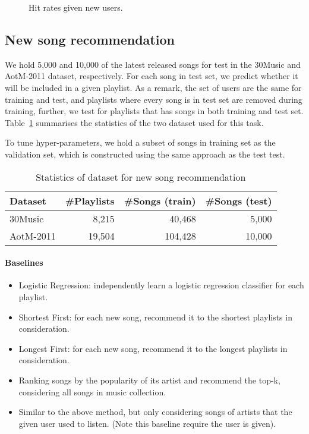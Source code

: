 

\begin{figure}[!h]
\centering
\caption{Hit rates given new users.}
\end{figure}



\subsection{New song recommendation}
\label{ssec:newsongrec}

We hold 5,000 and 10,000 of the latest released songs for test in the 30Music and AotM-2011 dataset, respectively.
For each song in test set, we predict whether it will be included in a given playlist.
As a remark, the set of users are the same for training and test, 
and playlists where every song is in test set are removed during training,
further, we test for playlists that has songs in both training and test set.
Table~\ref{tab:stats_newsongrec} summarises the statistics of the two dataset used for this task.

To tune hyper-parameters, we hold a subset of songs in training set as the validation set, 
which is constructed using the same approach as the test test.

\begin{table}[!h]
\centering
\caption{Statistics of dataset for new song recommendation}
\label{tab:stats_newsongrec}
\small
\begin{tabular}{lrrr}
\toprule
Dataset   & \#Playlists & \#Songs (train) & \#Songs (test) \\
\midrule
30Music   & 8,215       & 40,468          & 5,000 \\
AotM-2011 & 19,504      & 104,428         & 10,000 \\
\bottomrule
\end{tabular}
\end{table}

\paragraph{Baselines}
\begin{itemize}
\item Logistic Regression: independently learn a logistic regression classifier for each playlist.
\item Shortest First: for each new song, recommend it to the shortest playlists in consideration.
\item Longest First: for each new song, recommend it to the longest playlists in consideration.
\item Ranking songs by the popularity of its artist and recommend the top-k, considering all songs in music collection.
\item Similar to the above method, but only considering songs of artists that the given user used to listen. 
(Note this baseline require the user is given).
\end{itemize}



